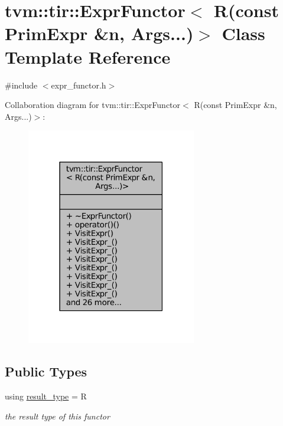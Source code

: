 \hypertarget{classtvm_1_1tir_1_1ExprFunctor_3_01R_07const_01PrimExpr_01_6n_00_01Args_8_8_8_08_4}{}\section{tvm\+:\+:tir\+:\+:Expr\+Functor$<$ R(const Prim\+Expr \&n, Args...)$>$ Class Template Reference}
\label{classtvm_1_1tir_1_1ExprFunctor_3_01R_07const_01PrimExpr_01_6n_00_01Args_8_8_8_08_4}


{\ttfamily \#include $<$expr\+\_\+functor.\+h$>$}



Collaboration diagram for tvm\+:\+:tir\+:\+:Expr\+Functor$<$ R(const Prim\+Expr \&n, Args...)$>$\+:
\nopagebreak
\begin{figure}[H]
\begin{center}
\leavevmode
\includegraphics[width=210pt]{classtvm_1_1tir_1_1ExprFunctor_3_01R_07const_01PrimExpr_01_6n_00_01Args_8_8_8_08_4__coll__graph}
\end{center}
\end{figure}
\subsection*{Public Types}
\begin{DoxyCompactItemize}
\item 
using \hyperlink{classtvm_1_1tir_1_1ExprFunctor_3_01R_07const_01PrimExpr_01_6n_00_01Args_8_8_8_08_4_aa334dfc7ba5e0e7b434da07bed12dde4}{result\+\_\+type} = R
\begin{DoxyCompactList}\small\item\em the result type of this functor \end{DoxyCompactList}\end{DoxyCompactItemize}
